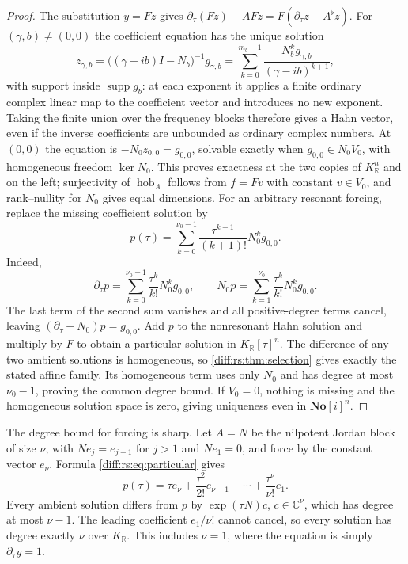 \documentclass[11pt,letterpaper]{article}
\numberwithin{equation}{section}
\theoremstyle{definition}
\theoremstyle{remark}
\newcommand{\SC}{\mathbf{No}[i]}
\newcommand{\R}{\mathbb R}
\newcommand{\C}{\mathbb C}
\newcommand{\der}{\partial}
\newcommand{\supp}{\operatorname{supp}}
\newcommand{\Ker}{\operatorname{ker}}
\newcommand{\derT}{\der_{\tau}}
\newcommand{\KR}{K_{\R}}
\newcommand{\hob}{\operatorname{hob}}
\begin{document}
\begin{proof}
The substitution $y=Fz$ gives $\derT(Fz)-AFz=F(\derT z-A^{\flat}z)$. For
$(\gamma,b)\neq(0,0)$ the coefficient equation has the unique solution
\begin{equation}\label{diff:rs:eq:coeffresolvent}
 z_{\gamma,b}=\bigl((\gamma-ib)I-N_{b}\bigr)^{-1}g_{\gamma,b}
 =\sum_{k=0}^{m_{b}-1}\frac{N_{b}^{k}g_{\gamma,b}}{(\gamma-ib)^{k+1}},
\end{equation}
with support inside $\supp g_b$: at each exponent it applies a
finite ordinary complex linear map to the coefficient vector and
introduces no new exponent. Taking the finite union over the frequency
blocks therefore gives a Hahn vector, even if the inverse coefficients
are unbounded as ordinary complex numbers. At
$(0,0)$ the equation is $-N_{0}z_{0,0}=g_{0,0}$, solvable exactly when
$g_{0,0}\in N_{0}V_{0}$, with homogeneous freedom $\Ker N_{0}$. This proves
exactness at the two copies of $\KR^{n}$ and on the left; surjectivity of
$\hob_{A}$ follows from $f=Fv$ with constant $v\in V_{0}$, and rank--nullity for
$N_{0}$ gives equal dimensions. For an arbitrary resonant forcing, replace the
missing coefficient solution by
\begin{equation}\label{diff:rs:eq:particular}
 p(\tau)=\sum_{k=0}^{\nu_{0}-1}\frac{\tau^{k+1}}{(k+1)!}N_{0}^{k}g_{0,0}.
\end{equation}
Indeed,
\[
 \derT p=\sum_{k=0}^{\nu_0-1}\frac{\tau^k}{k!}N_0^kg_{0,0},
 \qquad
 N_0p=\sum_{k=1}^{\nu_0}\frac{\tau^k}{k!}N_0^kg_{0,0}.
\]
The last term of the second sum vanishes and all positive-degree
terms cancel, leaving $(\derT-N_0)p=g_{0,0}$. Add $p$ to the
nonresonant Hahn solution and multiply by $F$ to obtain a particular
solution in $\KR[\tau]^n$. The difference of any two ambient
solutions is homogeneous, so \cref{diff:rs:thm:selection} gives exactly
the stated affine family. Its homogeneous term uses only $N_0$ and
has degree at most $\nu_0-1$, proving the common degree bound.
If $V_0=0$, nothing is missing and the homogeneous solution space is
zero, giving uniqueness even in $\SC^n$.
\end{proof}

The degree bound for forcing is sharp. Let $A=N$ be the nilpotent
Jordan block of size $\nu$, with $Ne_j=e_{j-1}$ for $j>1$ and
$Ne_1=0$, and force by the constant vector $e_\nu$. Formula
\eqref{diff:rs:eq:particular} gives
\[
 p(\tau)=\tau e_\nu+\frac{\tau^2}{2!}e_{\nu-1}
             +\cdots+\frac{\tau^\nu}{\nu!}e_1.
\]
Every ambient solution differs from $p$ by $\exp(\tau N)c$,
$c\in\C^\nu$, which has degree at most $\nu-1$. The leading
coefficient $e_1/\nu!$ cannot cancel, so every solution has degree
exactly $\nu$ over $\KR$. This includes $\nu=1$, where the equation
is simply $\derT y=1$.
\end{document}
